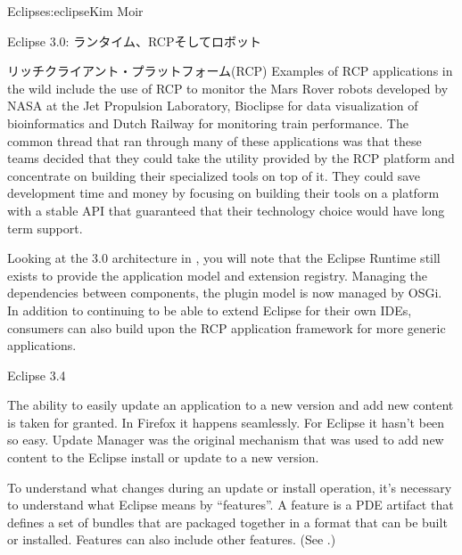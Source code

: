 \begin{aosachapter}{Eclipse}{s:eclipse}{Kim Moir}
\begin{aosasect1}{Eclipse 3.0: ランタイム、RCPそしてロボット}
\begin{aosasect2}{リッチクライアント・プラットフォーム(RCP)}
Examples of RCP applications in the wild include the use of RCP to monitor the
Mars Rover robots developed by NASA at the Jet Propulsion Laboratory,
Bioclipse for data visualization of bioinformatics and Dutch Railway
for monitoring train performance.  The common thread that ran through
many of these applications was that these teams decided that they
could take the utility provided by the RCP platform and concentrate on
building their specialized tools on top of it. They could save
development time and money by focusing on building their tools on a
platform with a stable API that guaranteed that their technology
choice would have long term support.


Looking at the 3.0 architecture in , you will
note that the Eclipse Runtime still exists to provide the application
model and extension registry.  Managing the dependencies between
components, the plugin model is now managed by OSGi. In addition
to continuing to be able to extend Eclipse for their own IDEs,
consumers can also build upon the RCP application framework for more
generic applications.

\end{aosasect2}

\end{aosasect1}

\begin{aosasect1}{Eclipse 3.4}

The ability to easily update an application to a new version and add
new content is taken for granted. In Firefox it happens seamlessly.
For Eclipse it hasn't been so easy. Update Manager was the original
mechanism that was used to add new content to the Eclipse install or
update to a new version.

To understand what changes during an update or install operation,
it's necessary to understand what Eclipse means by ``features''.
A feature is a PDE artifact that defines a set
of bundles that are packaged together in a format that can be built or
installed. Features can also include other features. (See
.)



\end{aosasect1}
\end{aosachapter}
